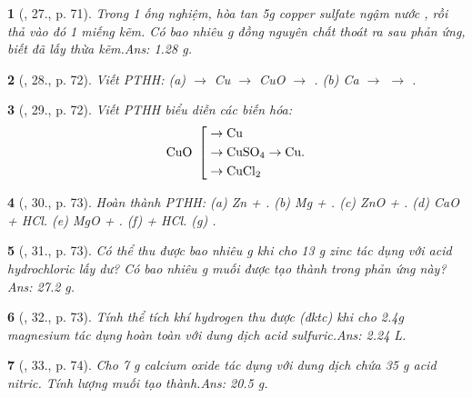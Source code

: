 \documentclass{article}
\newtheorem{baitoan}{}
\begin{document}
\begin{baitoan}[\cite{An_Hoa_Hoc_nang_cao_8_9}, 27., p. 71]
	Trong 1 ống nghiệm, hòa tan {\rm5g} copper sulfate ngậm nước {\rm{}}, rồi thả vào đó 1 miếng kẽm. Có bao nhiêu {\rm g} đồng nguyên chất thoát ra sau phản ứng, biết đã lấy thừa kẽm.\hfill{\sf Ans: 1.28 g.}
\end{baitoan}

\begin{baitoan}[\cite{An_Hoa_Hoc_nang_cao_8_9}, 28., p. 72]
	Viết {\rm PTHH}: (a) {\rm{} $\to$ Cu $\to$ CuO $\to$ }. (b) {\rm Ca $\to$  $\to$ }.
\end{baitoan}

\begin{baitoan}[\cite{An_Hoa_Hoc_nang_cao_8_9}, 29., p. 72]
	Viết {\rm PTHH} biểu diễn các biến hóa: 
	\begin{equation*}
		{\rm CuO}\ \left[\begin{split}
			&\to{\rm Cu}\\
			&\to\ce{CuSO4}\to{\rm Cu}.\\
			&\to\ce{CuCl2}
		\end{split}\right.
	\end{equation*}
\end{baitoan}

\begin{baitoan}[\cite{An_Hoa_Hoc_nang_cao_8_9}, 30., p. 73]
	Hoàn thành {\rm PTHH}: (a) {\rm Zn + }. (b) {\rm Mg + }. (c) {\rm ZnO + }. (d) {\rm CaO + HCl}. (e) {\rm MgO + }. (f) {\rm{} + HCl}. (g) {\rm{}}.
\end{baitoan}

\begin{baitoan}[\cite{An_Hoa_Hoc_nang_cao_8_9}, 31., p. 73]
	Có thể thu được bao nhiêu {\rm g } khi cho {\rm13 g} zinc tác dụng với acid hydrochloric lấy dư? Có bao nhiêu {\rm g} muối được tạo thành trong phản ứng này?\hfill{\sf Ans: 27.2 g.}
\end{baitoan}

\begin{baitoan}[\cite{An_Hoa_Hoc_nang_cao_8_9}, 32., p. 73]
	Tính thể tích khí hydrogen thu được (đktc) khi cho {\rm2.4g} magnesium tác dụng hoàn toàn với dung dịch acid sulfuric.\hfill{\sf Ans: 2.24 L.}
\end{baitoan}

\begin{baitoan}[\cite{An_Hoa_Hoc_nang_cao_8_9}, 33., p. 74]
	Cho {\rm7 g} calcium oxide tác dụng với dung dịch chứa {\rm35 g} acid nitric. Tính lượng muối tạo thành.\hfill{\sf Ans: 20.5 g.}
\end{baitoan}
\end{document}
